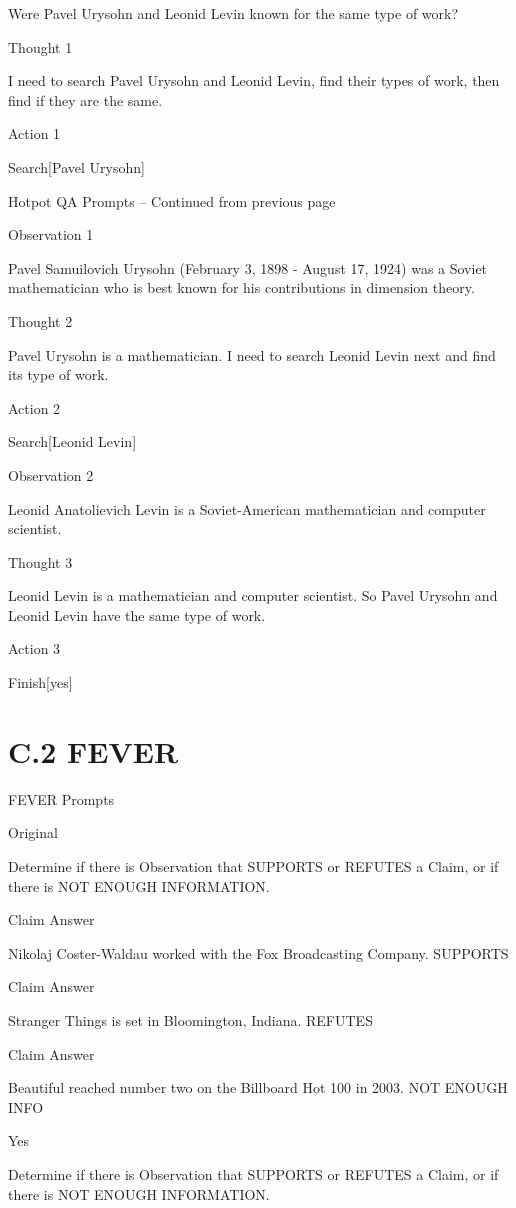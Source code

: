 \documentclass[
]{article}
\begin{document}
Were Pavel Urysohn and Leonid Levin known for the same type of work?

Thought 1

I need to search Pavel Urysohn and Leonid Levin, find their types of
work, then find if they are the same.

Action 1

Search{[}Pavel Urysohn{]}

Hotpot QA Prompts -- Continued from previous page

Observation 1

Pavel Samuilovich Urysohn (February 3, 1898 - August 17, 1924) was a
Soviet mathematician who is best known for his contributions in
dimension theory.

Thought 2

Pavel Urysohn is a mathematician. I need to search Leonid Levin next and
find its type of work.

Action 2

Search{[}Leonid Levin{]}

Observation 2

Leonid Anatolievich Levin is a Soviet-American mathematician and
computer scientist.

Thought 3

Leonid Levin is a mathematician and computer scientist. So Pavel Urysohn
and Leonid Levin have the same type of work.

Action 3

Finish{[}yes{]}

\section{C.2 FEVER}\label{c.2-fever}

FEVER Prompts

Original

Determine if there is Observation that SUPPORTS or REFUTES a Claim, or
if there is NOT ENOUGH INFORMATION.

Claim Answer

Nikolaj Coster-Waldau worked with the Fox Broadcasting Company. SUPPORTS

Claim Answer

Stranger Things is set in Bloomington, Indiana. REFUTES

Claim Answer

Beautiful reached number two on the Billboard Hot 100 in 2003. NOT
ENOUGH INFO

Yes

Determine if there is Observation that SUPPORTS or REFUTES a Claim, or
if there is NOT ENOUGH INFORMATION.
\end{document}
